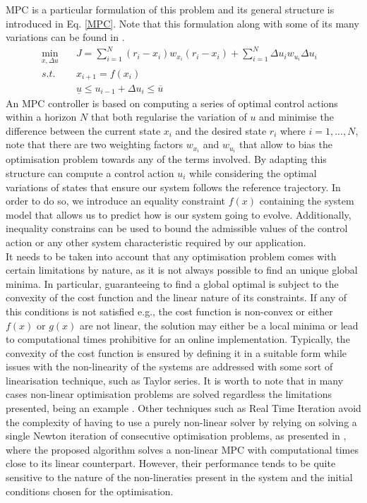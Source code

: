 \documentclass[a4paper,fleqn]{cas-sc}
\begin{document}
MPC is a particular formulation of this problem and its general structure is introduced in Eq. \eqref{MPC}. Note that this formulation along with some of its many variations can be found in \cite{Bai2019}.
\begin{equation}
\label{MPC}
\begin{aligned}
\min\limits_{x,\Delta u}  &\quad J=\sum_{i=1}^{N} (r_i-x_i)w_{x_i}(r_i-x_i) +  \sum_{i=1}^{N} \Delta u_i w_{u_i}\Delta u_i&\\ 
s.t.             &\quad x_{i+1}=f(x_i)\\ 
&\quad \underline{u} \leq u_{i-1} + \Delta u_i \leq \overline{u}
\end{aligned}
\end{equation}
An MPC controller is based on computing a series of optimal control actions within a horizon $N$ that both regularise the variation of $u$ and minimise the difference between the current state $x_i$ and the desired state $r_i$ where $i = 1,...,N$, note that there are two weighting factors $w_{x_i}$ and $w_{u_i}$ that allow to bias the optimisation problem towards any of the terms involved. By adapting this structure can compute a control action $u_i$ while considering the optimal variations of states that ensure our system follows the reference trajectory. In order to do so, we introduce an equality constraint $f(x)$ containing the system model that allows us to predict how is our system going to evolve. Additionally, inequality constrains can be used to bound the admissible values of the control action or any other system characteristic required by our application.  \\

It needs to be taken into account that any optimisation problem comes with certain limitations by nature, as it is not always possible to find an unique global minima. In particular, guaranteeing to find a global optimal is subject to the convexity of the cost function and the linear nature of its constraints. If any of this conditions is not satisfied e.g., the cost function is non-convex or either $f(x)$ or $g(x)$ are not linear, the solution may either be a local minima or lead to computational times prohibitive for an online implementation. Typically, the convexity of the cost function is ensured by defining it in a suitable form while issues with the non-linearity of the systems are addressed with some sort of linearisation technique, such as Taylor series. It is worth to note that in many cases non-linear optimisation problems are solved regardless the limitations presented, being an example \cite{gao2010predictive}. Other techniques such as Real Time Iteration avoid the complexity of having to use a purely non-linear solver by relying on solving a single Newton iteration of consecutive optimisation problems, as presented in \cite{RTI}, where the proposed algorithm solves a non-linear MPC with computational times close to its linear counterpart. However, their performance tends to be quite sensitive to the nature of the non-lineraties present in the system and the initial conditions chosen for the optimisation.\\
\end{document}
